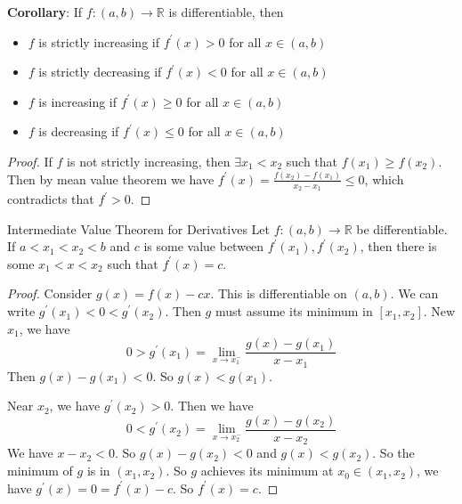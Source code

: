 \documentclass{report}
\begin{document}
\textbf{Corollary}: If $f : (a, b) \rightarrow \mathbb{R}$ is differentiable, then 
    \begin{itemize}
        \item  $f$ is strictly increasing if $f^{\prime}(x) > 0$ for all $x \in (a, b)$

        \item  $f$ is strictly decreasing if $f^{\prime}(x) < 0$ for all $x \in (a, b)$

        \item $f$ is increasing if $f^{\prime}(x) \geq 0$ for all $x \in (a, b)$

        \item $f$ is decreasing if $f^{\prime}(x) \leq 0$ for all $x \in (a, b)$ 
    \end{itemize}
    \begin{proof}
        If $f$ is not strictly increasing, then $\exists x_{1} < x_{2}$ such that $f(x_{1}) \geq f(x_{2})$. Then by mean value theorem we have $f^{\prime}(x) = \frac{f(x_{2}) - f(x_{1})}{x_{2} - x_{1}} \leq 0$, which contradicts that $f^{\prime}> 0$.
    \end{proof}

\begin{theorem}{Intermediate Value Theorem for Derivatives}
    Let $f: (a, b) \rightarrow \mathbb{R}$ be differentiable. If $a < x_{1} < x_{2}< b$ and $c$ is some value between $f^{\prime}(x_{1}), f^{\prime}(x_{2})$, then there is some $x_{1} < x < x_{2}$ such that $f^{\prime}(x) = c$.
\end{theorem}
    \begin{proof}
        Consider $g(x) = f(x) - cx$. This is differentiable on $(a, b)$. We can write $g^{\prime}(x_{1}) < 0 < g^{\prime}(x_{2})$. Then $g$ must assume its minimum in $[x_{1}, x_{2}]$. New $x_{1}$, we have 
            \begin{equation*}
                0 > g^{\prime}(x_{1}) = \lim\limits_{x \to x^{-}_{1}}\dfrac{g(x) - g(x_{1})}{x - x_{1}}
            \end{equation*}
        Then $g(x) - g(x_{1}) < 0$. So $g(x) < g(x_{1})$.

        Near $x_{2}$, we have $g^{\prime}(x_{2}) > 0$. Then we have
            \begin{equation*}
                0 < g^{\prime}(x_{2}) = \lim\limits_{x \to x_{2}^{-}}\dfrac{g(x) - g(x_{2})}{x - x_{2}}
            \end{equation*}
        We have $x - x_{2} < 0$. So $g(x) - g(x_{2}) < 0$ and $g(x) < g(x_{2})$. So the minimum of $g$ is in $(x_{1}, x_{2})$. So $g$ achieves its minimum at $x_{0} \in (x_{1}, x_{2})$, we have $g^{\prime}(x) = 0 = f^{\prime}(x) - c$. So $f^{\prime}(x) = c$.
    \end{proof}
\end{document}
